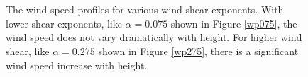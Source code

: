 \begin{figure}[htbp]
  \centering
  \\
  \\
  \caption{\label{shear_profile}The wind speed profiles for various wind shear exponents. With lower shear exponents, like $\alpha=0.075$ shown in Figure \ref{wp075}, the wind speed does not vary dramatically with height. For higher wind shear, like $\alpha=0.275$ shown in Figure \ref{wp275}, there is a significant wind speed increase with height.}
\end{figure}

